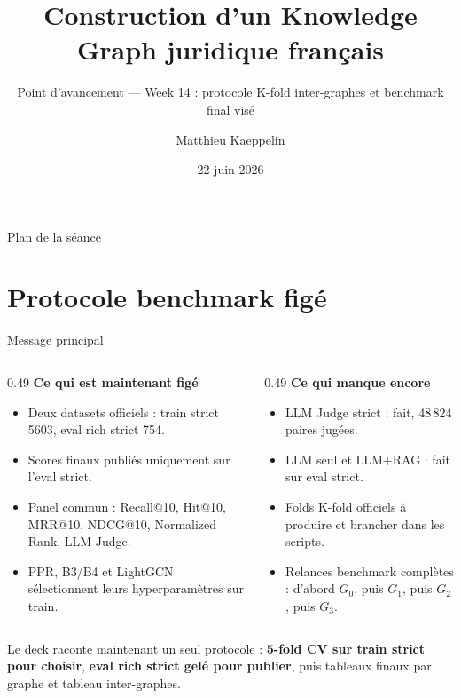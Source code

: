 \documentclass[aspectratio=169,10pt]{beamer}
\title[KG juridique FR --- Week 14]{Construction d'un Knowledge Graph juridique français}
\subtitle{Point d'avancement --- Week 14 : protocole K-fold inter-graphes et benchmark final visé}
\author{Matthieu Kaeppelin}
\institute{Stage FE Recherche}
\date{22 juin 2026}
\newcommand{\keybox}[1]{%
  \begin{center}
  \colorbox{accentsoft}{\parbox{0.92\linewidth}{\centering #1}}
  \end{center}}
\begin{document}
\begin{frame}
  \titlepage
\end{frame}

\begin{frame}{Plan de la séance}
  \scriptsize
  \tableofcontents[hideallsubsections]
\end{frame}

\section{Protocole benchmark figé}


\begin{frame}{Message principal}
  \footnotesize
  \begin{columns}[T,onlytextwidth]
    \begin{column}{0.49\textwidth}
      \textbf{Ce qui est maintenant figé}
      \begin{itemize}\setlength{\itemsep}{0.35em}
        \item Deux datasets officiels : train strict 5603, eval rich strict 754.
        \item Scores finaux publiés uniquement sur l'eval strict.
        \item Panel commun : Recall@10, Hit@10, MRR@10, NDCG@10, Normalized Rank, LLM Judge.
        \item PPR, B3/B4 et LightGCN sélectionnent leurs hyperparamètres sur train.
      \end{itemize}
    \end{column}
    \begin{column}{0.49\textwidth}
      \textbf{Ce qui manque encore}
      \begin{itemize}\setlength{\itemsep}{0.35em}
        \item LLM Judge strict : \textcolor{ok}{fait}, 48\,824 paires jugées.
        \item LLM seul et LLM+RAG : \textcolor{ok}{fait sur eval strict}.
        \item Folds K-fold officiels à produire et brancher dans les scripts.
        \item Relances benchmark complètes : d'abord $G_0$, puis $G_1$, puis $G_2$, puis $G_3$.
      \end{itemize}
    \end{column}
  \end{columns}

  \vspace{0.7em}
  \keybox{\scriptsize Le deck raconte maintenant un seul protocole : \textbf{5-fold CV sur train strict pour choisir},
  \textbf{eval rich strict gelé pour publier}, puis tableaux finaux par graphe et tableau inter-graphes.}
\end{frame}
\end{document}

